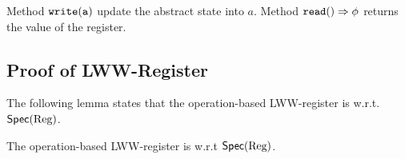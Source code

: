 Method $\alabelshort[{\tt write}]{a}$ update the abstract state into $a$. Method $\alabellong[{\tt read}]{}{\abstate}{}$ returns the value of the register.




\subsection{Proof of LWW-Register}
\label{subsec:proof of LWW-register}

The following lemma states that the operation-based LWW-register is \crdtlinearizable{} w.r.t. $\specReg$.

\begin{lemma}
\label{lemma:operation-based LWW-register is correct}
The operation-based LWW-register is \crdtlinearizable{} w.r.t $\specReg$.
\end{lemma}

